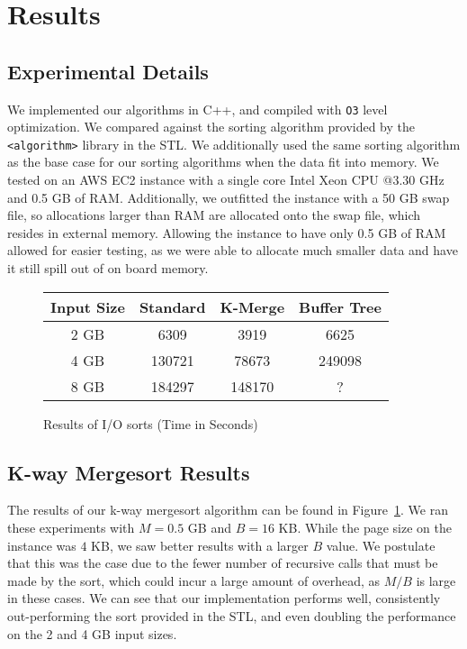 \documentclass{article}
\begin{document}
\section{Results}

\subsection{Experimental Details}
We implemented our algorithms in C++, and compiled with \texttt{O3} level
optimization.
%
We compared against the sorting algorithm provided by the
\texttt{<algorithm>} library in the STL.
%
We additionally used the same sorting algorithm as the base case for our
sorting algorithms when the data fit into memory.
%
We tested on an AWS EC2 instance with a single core Intel Xeon CPU @3.30 GHz and 0.5 GB of RAM.
%
Additionally, we outfitted the instance with a 50 GB swap file, so allocations
larger than RAM are allocated onto the swap file, which resides in external memory.
%
Allowing the instance to have only 0.5 GB of RAM allowed for easier testing,
as we were able to allocate much smaller data and have it still spill out of
on board memory.

\begin{figure}
  \centering
  \begin{tabular}{|c|c|c|c|}
    \hline
    Input Size & Standard & K-Merge & Buffer Tree \\
    \hline
    \hline
    2 GB & 6309 & 3919 & 6625 \\
    \hline
    4 GB & 130721 & 78673 & 249098 \\ %
    \hline
    8 GB & 184297 & 148170 & ? \\
    \hline
  \end{tabular}
  \caption{Results of I/O sorts (Time in Seconds)}
  \label{res}
\end{figure}

\subsection{K-way Mergesort Results}


The results of our k-way mergesort algorithm can be found in Figure~\ref{res}.
%
We ran these experiments with $M = 0.5$ GB and $B = 16$ KB.
%
While the page size on the instance was $4$ KB, we saw better results with a larger $B$
value.
%
We postulate that this was the case due to the fewer number of recursive calls that must be
made by the sort, which could incur a large amount of overhead, as $M/B$ is large in these cases.
%
We can see that our implementation performs well, consistently out-performing the sort
provided in the STL, and even doubling the performance on the 2 and 4 GB input sizes.
%
\end{document}
